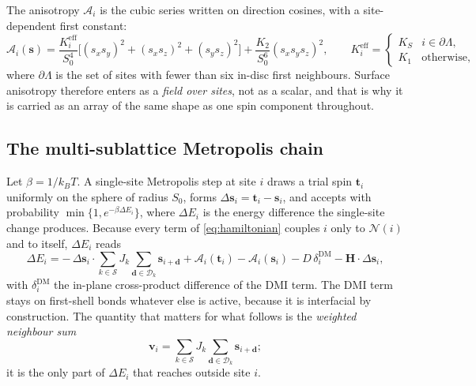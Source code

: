 \documentclass[11pt,a4paper]{article}
\newcommand{\vs}{\mathbf{s}}
\newcommand{\vt}{\mathbf{t}}
\newcommand{\vd}{\mathbf{d}}
\newcommand{\vH}{\mathbf{H}}
\newcommand{\shells}{\mathcal{S}}
\begin{document}
The anisotropy $\mathcal{A}_i$ is the cubic series written on direction
cosines, with a site-dependent first constant:
%
\begin{equation}
\mathcal{A}_i(\vs) = \frac{K^{\mathrm{eff}}_i}{S_0^4}
  \bigl[(s_x s_y)^2 + (s_x s_z)^2 + (s_y s_z)^2\bigr]
  + \frac{K_2}{S_0^6} (s_x s_y s_z)^2 ,
\qquad
K^{\mathrm{eff}}_i = \begin{cases}
  K_{\!S} & i \in \partial\Lambda, \\
  K_1     & \text{otherwise},
\end{cases}
\label{eq:anisotropy}
\end{equation}
%
where $\partial\Lambda$ is the set of sites with fewer than six in-disc first
neighbours. Surface anisotropy therefore enters as a \emph{field over sites},
not as a scalar, and that is why it is carried as an array of the same shape as
one spin component throughout.

\subsection{The multi-sublattice Metropolis chain}
\label{sec:chain}

Let $\beta = 1/k_B T$. A single-site Metropolis step at site $i$ draws a trial
spin $\vt_i$ uniformly on the sphere of radius $S_0$, forms
$\Delta \vs_i = \vt_i - \vs_i$, and accepts with probability
$\min\{1, e^{-\beta \Delta E_i}\}$, where $\Delta E_i$ is the energy difference
the single-site change produces. Because every term of \eqref{eq:hamiltonian}
couples $i$ only to $\mathcal{N}(i)$ and to itself, $\Delta E_i$ reads
%
\begin{equation}
\Delta E_i = -\, \Delta \vs_i \cdot
   \!\!\sum_{k \in \shells} J_k
   \!\!\sum_{\vd \in \mathcal{D}_k}\!\! \vs_{i + \vd}
 + \mathcal{A}_i(\vt_i) - \mathcal{A}_i(\vs_i)
 - D\, \delta^{\mathrm{DM}}_i - \vH \cdot \Delta \vs_i ,
\label{eq:deltaE}
\end{equation}
%
with $\delta^{\mathrm{DM}}_i$ the in-plane cross-product difference of the DMI
term. The DMI term stays on first-shell bonds whatever else is active, because
it is interfacial by construction. The quantity that matters for what follows is
the \emph{weighted neighbour sum}
%
\begin{equation}
\mathbf{v}_i = \sum_{k \in \shells} J_k \sum_{\vd \in \mathcal{D}_k}
  \vs_{i+\vd} ;
\label{eq:nsum}
\end{equation}
%
it is the only part of $\Delta E_i$ that reaches outside site $i$.
\end{document}
